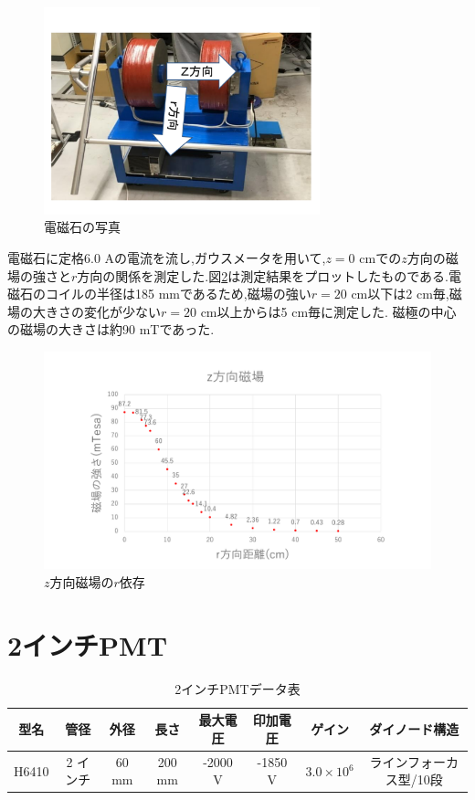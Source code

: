 \begin{figure}[tbp]
	\centering
	\includegraphics[width=8cm]{fig/iguchi/magnetphoto.pdf}
	\caption{電磁石の写真}
	\label{magphoto}
\end{figure}

\newpage
電磁石に定格6.0 Aの電流を流し,ガウスメータを用いて,$z=0$ cmでの$z$方向の磁場の強さと$r$方向の関係を測定した.図\ref{maggraph01}は測定結果をプロットしたものである.電磁石のコイルの半径は185 mmであるため,磁場の強い$r=20$ cm以下は2 cm毎,磁場の大きさの変化が少ない$r=20$ cm以上からは5 cm毎に測定した.
磁極の中心の磁場の大きさは約90 mTであった.
\begin{figure}[tbp]
	\centering
	\includegraphics[width=15cm]{fig/iguchi/maggraph01.pdf}
	\caption{$z$方向磁場の$r$依存}
	\label{maggraph01}
\end{figure}


\newpage
\section{2インチPMT}

\begin{table}[tbp]
	\centering
	 \begin{tabular}{cccccccc}\hline
	型名& 管径 & 外径 & 長さ & 最大電圧 & 印加電圧 & ゲイン & ダイノード構造 \\ \hline \hline
	H6410 & 2 インチ & 60 mm & 200 mm & -2000 V & -1850 V & $3.0\times10{^{6}}$ &ラインフォーカス型/10段 \\ \hline
	\end{tabular}
	  \caption{2インチPMTデータ表}
	  \label{PMTdata}
\end{table}

